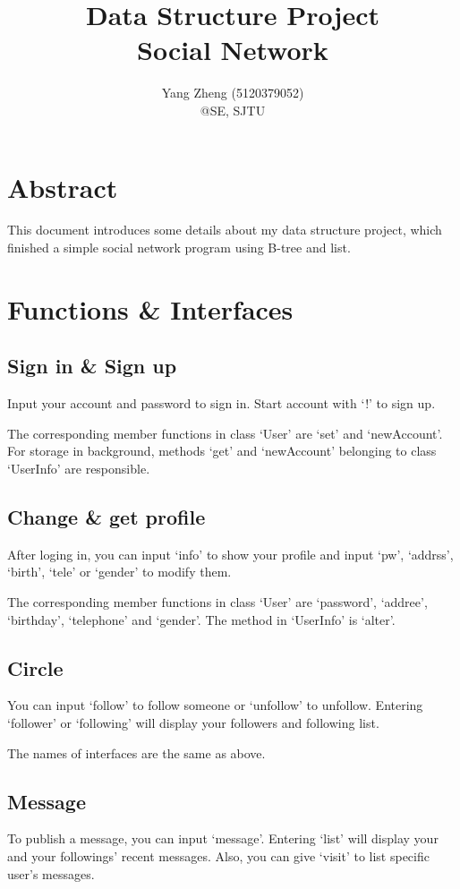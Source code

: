 \documentclass[a4paper, 11pt]{article}
\author{Yang Zheng (5120379052)\\\small{@SE, SJTU}}
\title{Data Structure Project\\\large{Social Network}}
\date{}
\begin{document}
\maketitle
\tableofcontents
\section{Abstract}
This document introduces some details about my data structure project, which finished a simple social network program using B-tree and list.

\section{Functions \& Interfaces}
\subsection{Sign in \& Sign up}
Input your account and password to sign in. Start account with `!' to sign up.

The corresponding member functions in class `User' are `set' and `newAccount'. For storage in background, methods `get' and `newAccount' belonging to class `UserInfo' are responsible.

\subsection{Change \& get profile}
After loging in, you can input `info' to show your profile and input `pw', `addrss', `birth', `tele' or `gender' to modify them.

The corresponding member functions in class `User' are `password', `addree', `birthday', `telephone' and `gender'. The method in `UserInfo' is `alter'.

\subsection{Circle}
You can input `follow' to follow someone or `unfollow' to unfollow. Entering `follower' or `following' will display your followers and following list.

The names of interfaces are the same as above.

\subsection{Message}
To publish a message, you can input `message'. Entering `list' will display your and your followings' recent messages. Also, you can give `visit' to list specific user's messages.
\end{document}
